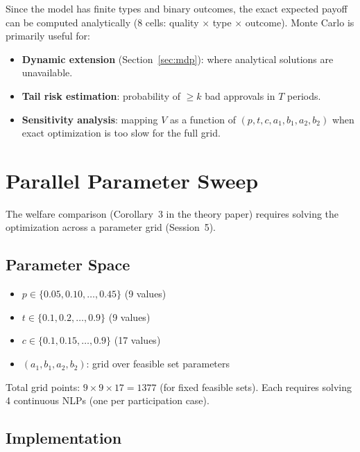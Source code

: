 \documentclass[12pt,a4paper]{article}
\begin{document}
Since the model has finite types and binary outcomes, the
exact expected payoff can be computed analytically (8 cells:
quality $\times$ type $\times$ outcome). Monte Carlo is
primarily useful for:

\begin{itemize}
  \item \textbf{Dynamic extension} (Section~\ref{sec:mdp}):
    where analytical solutions are unavailable.
  \item \textbf{Tail risk estimation}: probability of
    $\geq k$ bad approvals in $T$ periods.
  \item \textbf{Sensitivity analysis}: mapping $V$ as a
    function of $(p, t, c, a_1, b_1, a_2, b_2)$ when
    exact optimization is too slow for the full grid.
\end{itemize}


\section{Parallel Parameter Sweep}
\label{sec:parallel}

The welfare comparison (Corollary~3 in the theory paper)
requires solving the optimization across a parameter grid
(Session~5).

\subsection{Parameter Space}

\begin{itemize}
  \item $p \in \{0.05, 0.10, \ldots, 0.45\}$
    \hfill (9 values)
  \item $t \in \{0.1, 0.2, \ldots, 0.9\}$
    \hfill (9 values)
  \item $c \in \{0.1, 0.15, \ldots, 0.9\}$
    \hfill (17 values)
  \item $(a_1, b_1, a_2, b_2)$: grid over feasible set
    parameters
\end{itemize}

Total grid points: $9 \times 9 \times 17 = 1377$ (for
fixed feasible sets). Each requires solving 4 continuous
NLPs (one per participation case).

\subsection{Implementation}
\end{document}

